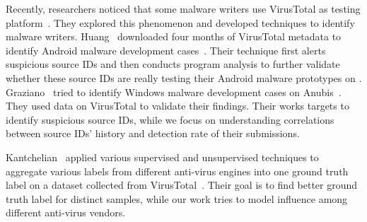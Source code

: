 Recently, researchers noticed that some malware writers use VirusTotal as testing platform~\cite{huangvt2016bigdata, neeles}.
They explored this phenomenon and developed techniques to identify malware writers. 
Huang \etal\ downloaded four months of VirusTotal metadata to identify Android malware development cases~\cite{huangvt2016bigdata}. 
Their technique first alerts suspicious source IDs 
and then conducts program analysis to further validate whether 
these source IDs are really testing their Android malware prototypes on \vt{}. 
Graziano \etal\ tried to identify Windows malware development cases on Anubis~\cite{neeles}. 
They used data on VirusTotal to validate their findings. 
Their works targets to identify suspicious source IDs, 
while we focus on understanding correlations between source IDs' history and detection rate of their submissions.

Kantchelian \etal\ applied various supervised and unsupervised 
techniques to aggregate various labels from different anti-virus engines into one ground truth label 
on a dataset collected from VirusTotal~\cite{betterGT}. 
Their goal is to find better ground truth label for distinct samples, 
while our work tries to model influence among different anti-virus vendors.  


